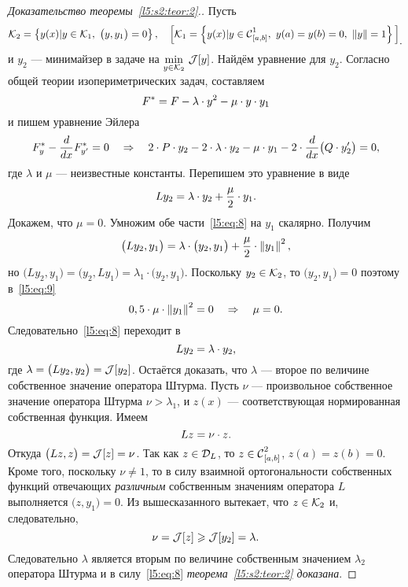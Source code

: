\begin{proof}[Доказательство теоремы~\ref{l5:s2:teor:2}.] Пусть 
	\begin{equation*}
		\hfill\K_2=\left\{y(x)|y\in\K_1,\ \big(y,y_1\big)=0\right\},\quad\Big[\K_1=\left\{y(x)|y\in\Cfn[{[a,b]}]{1},\ y(a)=y(b)=0,\ \norm{y}=1\right\}\Big]_{\displaystyle.}\hfill
	\end{equation*} 
	и $y_2$ --- минимайзер в задаче на $\min\limits_{y\in\K_2}\,\J[y]$. Найдём уравнение для $y_2$. Согласно общей теории изопериметрических задач, составляем 
	\begin{equation*}
		\hfill F^{\ast}=F-\lambda\cdot y^2-\mu\cdot y\cdot y_1\hfill
	\end{equation*}
	и пишем уравнение Эйлера 
	\begin{equation*}
		\hfill F^{\ast}_y-\der{}{x}F^{\ast}_{y'}=0\quad\Rightarrow\quad 2\cdot P\cdot y_2-2\cdot\lambda\cdot y_2-\mu\cdot y_1-2\cdot\der{}{x}\big(Q\cdot y'_2\big)=0,\hfill
	\end{equation*}
	где $\lambda$ и $\mu$ --- неизвестные константы. Перепишем это уравнение в виде
	\begin{equation}
		\label{l5:eq:8}
		\hfill Ly_2=\lambda\cdot y_2+\frac{\mu}2\cdot y_1.\hfill
	\end{equation}
	Докажем, что $\mu=0$. Умножим обе части~\eqref{l5:eq:8} на $y_1$ скалярно. Получим
	\begin{equation}
		\label{l5:eq:9}
		\hfill\big(Ly_2,y_1\big)=\lambda\cdot\big(y_2,y_1\big)+\frac{\mu}{2}\cdot \norm{y_1}^2,\hfill
	\end{equation} 
	но $\big(Ly_2,y_1\big)=\big(y_2,Ly_1\big)=\lambda_1\cdot\big(y_2,y_1\big)$. Поскольку $y_2\in\K_2$, то $\big(y_2,y_1\big)=0$ поэтому в~\eqref{l5:eq:9}
	\begin{equation*}
		\hfill 0,5\cdot\mu\cdot\norm{y_1}^2=0\quad\Rightarrow\quad\mu=0.\hfill
	\end{equation*}
	Следовательно~\eqref{l5:eq:8} переходит в 
	\begin{equation*}
		\hfill Ly_2=\lambda\cdot y_2,\hfill
	\end{equation*}
	где $\lambda=\big(Ly_2,y_2\big)=\J[y_2]$. Остаётся доказать, что $\lambda$ --- второе по величине собственное значение оператора Штурма. Пусть $\nu$ --- произвольное собственное значение оператора Штурма $\nu>\lambda_1$, и $z(x)$ --- соответствующая нормированная собственная функция. Имеем 
	\begin{equation*}
		\hfill Lz=\nu\cdot z.\hfill
	\end{equation*}
	Откуда $\big(Lz,z\big)=\J[z]=\nu$. Так как $z\in\mc{D}_{L}$, то $z\in\Cfn[{[a,b]}]{2}$, $z(a)=z(b)=0$. Кроме того, поскольку $\nu\neq1$, то в силу взаимной ортогональности собственных функций отвечающих \emph{различным} собственным значениям оператора $L$ выполняется $\big(z,y_1\big)=0$. Из вышесказанного вытекает, что $z\in\K_2$ и, следовательно,
	\begin{equation*}
		\hfill\nu=\J[z]\geqslant\J[y_2]=\lambda.\hfill
	\end{equation*} 
	Следовательно $\lambda$ является вторым по величине собственным значением $\lambda_2$ оператора Штурма и в силу~\eqref{l5:eq:8} \emph{теорема~\ref{l5:s2:teor:2} доказана}. 
\end{proof}
